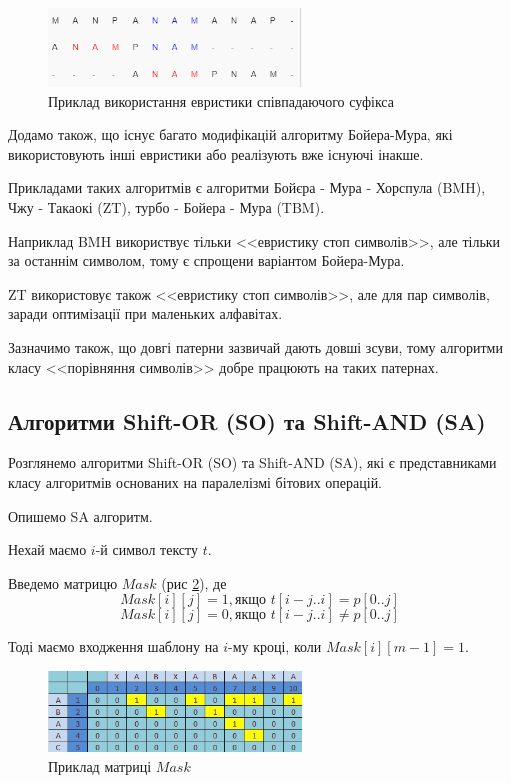 \documentclass[a4paper,14pt]{extarticle} %
\begin{document}
	\begin{figure}[h] %
		\centering %
		\includegraphics[width=0.6\textwidth]{images/boyer_moore_suffix.png} %
		\caption{Приклад використання евристики співпадаючого суфікса} %
		\label{fig:boyer_moore_suffix} %
	\end{figure}

    \newpage
	Додамо також, що існує багато модифікацій алгоритму Бойера-Мура, які використовують інші евристики або реалізують вже існуючі інакше.
	
	Прикладами таких алгоритмів є алгоритми Бойєра - Мура - Хорспула (BMH), Чжу - Такаокі (ZT), турбо - Бойера - Мура (TBM).

	Наприклад BMH використвує тільки <<евристику стоп символів>>, але тільки за останнім символом, тому є спрощени варіантом Бойера-Мура.

	ZT використовує також <<евристику стоп символів>>, але для пар символів, заради оптимізації при маленьких алфавітах.

	Зазначимо також, що довгі патерни зазвичай дають довші зсуви, тому алгоритми класу <<порівняння символів>> добре працюють на таких патернах.
	\subsection{Алгоритми Shift-OR (SO) та Shift-AND (SA)}

	Розглянемо алгоритми Shift-OR (SO) та Shift-AND (SA), які є представниками класу алгоритмів основаних на паралелізмі бітових операцій.

	Опишемо SA алгоритм.

	Нехай маємо $i$-й символ тексту $t$. 

	Введемо матрицю $Mask$ (рис \ref{fig:shift_or}), де
	\[Mask[i][j] = 1,\text{якщо } t[i-j..i] = p[0..j]\]
	\[Mask[i][j] = 0,\text{якщо } t[i-j..i] \neq  p[0..j]\]

	Тоді маємо входження шаблону на $i$-му кроці, коли $Mask[i][m-1] = 1$.
	\begin{figure}[h]
		\centering
		\includegraphics[width=0.6\textwidth]{images/sa_example.png}
		\caption{Приклад матриці $Mask$}
		\label{fig:shift_or}
	\end{figure}
\end{document}
